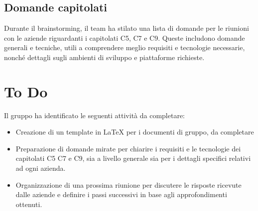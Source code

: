 \documentclass[a4paper, 12pt]{article}
\begin{document}
\subsection{Domande capitolati}
Durante il brainstorming, il team ha stilato una lista di domande per le riunioni con le aziende riguardanti i capitolati C5, C7 e C9. Queste includono domande generali e tecniche, utili a comprendere meglio requisiti e tecnologie necessarie, nonché dettagli sugli ambienti di sviluppo e piattaforme richieste.

\section{To Do}
Il gruppo ha identificato le seguenti attività da completare:
\begin{itemize}
    \item Creazione di un template in \LaTeX{} per i documenti di gruppo, da completare
    \item Preparazione di domande mirate per chiarire i requisiti e le tecnologie dei capitolati C5 C7 e C9, sia a livello generale sia per i dettagli specifici relativi ad ogni azienda.
    \item Organizzazione di una prossima riunione per discutere le risposte ricevute dalle aziende e definire i passi successivi in base agli approfondimenti ottenuti.
\end{itemize}
\end{document}
